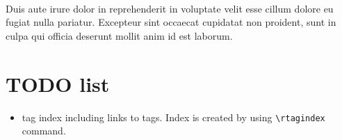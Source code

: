 \documentclass[11pt,onecolumn]{article}
\begin{document}
\\ Duis aute irure dolor in reprehenderit
in voluptate velit esse cillum dolore eu fugiat nulla
pariatur.  Excepteur sint occaecat
cupidatat non proident, sunt in culpa qui officia deserunt mollit anim
id est laborum. 



\section{TODO list}

\begin{itemize} 
\item tag index including links to tags. Index is created by using
  {\tt \textbackslash rtagindex} command.
\end{itemize} 
\end{document}
